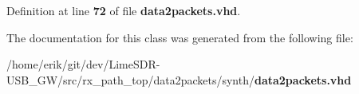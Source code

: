 Definition at line {\bf 72} of file {\bf data2packets.\+vhd}.



The documentation for this class was generated from the following file\+:\begin{DoxyCompactItemize}
\item 
/home/erik/git/dev/\+Lime\+S\+D\+R-\/\+U\+S\+B\+\_\+\+G\+W/src/rx\+\_\+path\+\_\+top/data2packets/synth/{\bf data2packets.\+vhd}\end{DoxyCompactItemize}
